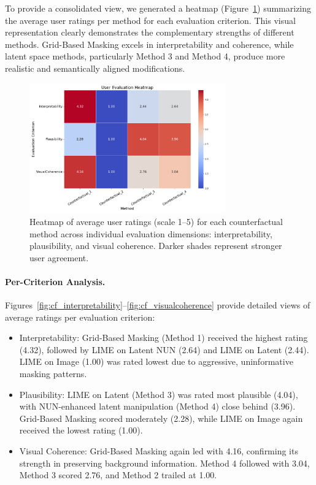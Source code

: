 To provide a consolidated view, we generated a heatmap (Figure~\ref{fig:heatmap_user_eval}) summarizing the average user ratings per method for each evaluation criterion. This visual representation clearly demonstrates the complementary strengths of different methods. Grid-Based Masking excels in interpretability and coherence, while latent space methods, particularly Method 3 and Method 4, produce more realistic and semantically aligned modifications.

\begin{figure}[htbp]
    \centering
    \includegraphics[width=0.75\textwidth]{img/human_rating_results/heatmap_user_evaluations.png}
    \caption[Heatmap of user evaluations by method and criterion]{%
Heatmap of average user ratings (scale 1–5) for each counterfactual method across individual evaluation dimensions: interpretability, plausibility, and visual coherence. Darker shades represent stronger user agreement.}
    \label{fig:heatmap_user_eval}
\end{figure}


\vspace{0.5em}
\paragraph{Per-Criterion Analysis.}
Figures~\ref{fig:cf_interpretability}--\ref{fig:cf_visualcoherence} provide detailed views of average ratings per evaluation criterion:

\begin{itemize}
    \item Interpretability: Grid-Based Masking (Method 1) received the highest rating (4.32), followed by LIME on Latent NUN (2.64) and LIME on Latent (2.44). LIME on Image (1.00) was rated lowest due to aggressive, uninformative masking patterns.
    \item Plausibility: LIME on Latent (Method 3) was rated most plausible (4.04), with NUN-enhanced latent manipulation (Method 4) close behind (3.96). Grid-Based Masking scored moderately (2.28), while LIME on Image again received the lowest rating (1.00).
    \item Visual Coherence: Grid-Based Masking again led with 4.16, confirming its strength in preserving background information. Method 4 followed with 3.04, Method 3 scored 2.76, and Method 2 trailed at 1.00.
\end{itemize}

